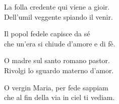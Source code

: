 
\spazio

\strofa La folla credente qui viene a gioir.\\
Dell'umil veggente spiando il venir.

\spazio


\spazio

\strofa Il popol fedele capisce da sé\\
che un'era si chiude d'amore e di fè.

\spazio


\spazio

\strofa O madre sul santo romano pastor.\\
Rivolgi lo sguardo materno d'amor.

\spazio


\spazio

\strofa O vergin Maria, per fede sappiam\\
che al fin della via in ciel ti vediam.

\spazio

